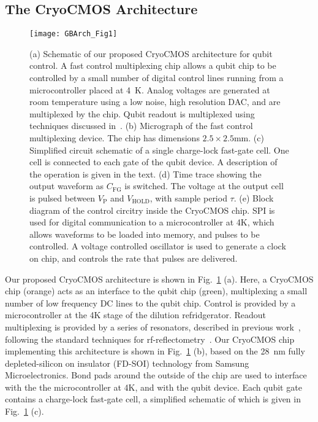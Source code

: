 \subsection{The CryoCMOS Architecture}

\begin{figure}
  \texttt{[image: GBArch\_Fig1]}
  \caption[Schematic of our proposed CryoCMOS architecture]
  {\label{fig:gbarch}(a) Schematic of our proposed CryoCMOS architecture for qubit control. A fast control multiplexing chip allows a qubit chip to be controlled
  by a small number of digital control lines running from a microcontroller placed at \SI{4}{\kelvin}. Analog voltages are generated at room temperature using a low
  noise, high resolution DAC, and are multiplexed by the chip. Qubit readout is multiplexed using techniques discussed in~\cite{doi:10.1063/1.4868107}. (b) Micrograph
  of the fast control multiplexing device. The chip has dimensions $2.5\times2.5\si{\milli\meter}$. (c) Simplified circuit schematic of a single charge-lock fast-gate
  cell. One cell is connected to each gate of the qubit device. A description of the operation is given in the text. (d) Time trace showing the output waveform as
  $C_\textrm{FG}$ is switched. The voltage at the output cell is pulsed between $V_\textrm{P}$ and $V_\textrm{HOLD}$, with sample period $\tau$.
  (e) Block diagram of the control circitry inside the CryoCMOS chip.  SPI is used for digital communication to a microcontroller at 4K, which allows waveforms
  to be loaded into memory, and pulses to be controlled. A voltage controlled oscillator is used to generate a clock on chip, and controls the rate that pulses are delivered.}
\end{figure}

Our proposed CryoCMOS architecture is shown in Fig.~\ref{fig:gbarch} (a). Here, a CryoCMOS chip (orange) acts as an interface to the qubit chip (green), multiplexing a small number
of low frequency DC lines to the qubit chip. Control is provided by a microcontroller at the 4K stage of the dilution refridgerator. Readout multiplexing is provided by a series of
resonators, described in previous work~\cite{doi:10.1063/1.4868107}, following the standard techniques for rf-reflectometry~\cite{Reilly:2007ig,barthel2009rapid}. Our CryoCMOS
chip implementing this architecture is shown in Fig.~\ref{fig:gbarch} (b), based on the \SI{28}{\nano\meter} fully depleted-silicon on insulator (FD-SOI) technology from Samsung
Microelectronics. Bond pads around the outside of the chip are used to interface with the the microcontroller at 4K, and with
the qubit device. Each qubit gate contains a charge-lock fast-gate cell, a simplified schematic of which is given in Fig.~\ref{fig:gbarch} (c).

